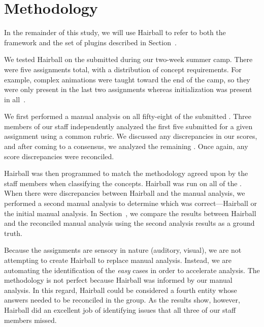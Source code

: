 \section{Methodology} 
In the remainder of this study, we will use Hairball to refer to both the
framework and the set of plugins described in Section~.

We tested Hairball on the  submitted during our two-week summer
camp.  There were five assignments total, with a distribution of concept
requirements. For example, complex animations were taught toward the end of the
camp, so they were only present in the last two assignments whereas
initialization was present in all~\cite{Franklin:2013:SBO}.

We first performed a manual analysis on all fifty-eight of the submitted
.  Three members of our staff independently analyzed the first five
 submitted for a given assignment using a common rubric. We
discussed any discrepancies in our scores, and after coming to a consensus, we
analyzed the remaining . Once again, any score discrepancies were
reconciled.

Hairball was then programmed to match the methodology agreed upon by the staff
members when classifying the concepts.  Hairball was run on all of the
.  When there were discrepancies between Hairball and the manual
analysis, we performed a second manual analysis to determine which was
correct---Hairball or the initial manual analysis. In
Section~, we compare the results between Hairball and the
reconciled manual analysis using the second analysis results as a ground truth.

Because the assignments are sensory in nature (auditory, visual), we are not
attempting to create Hairball to replace manual analysis.  Instead, we are
automating the identification of the \emph{easy} cases in order to accelerate
analysis.  The methodology is not perfect because Hairball was informed by our
manual analysis. In this regard, Hairball could be considered a fourth entity
whose answers needed to be reconciled in the group.  As the results show,
however, Hairball did an excellent job of identifying issues that all three of
our staff members missed.
